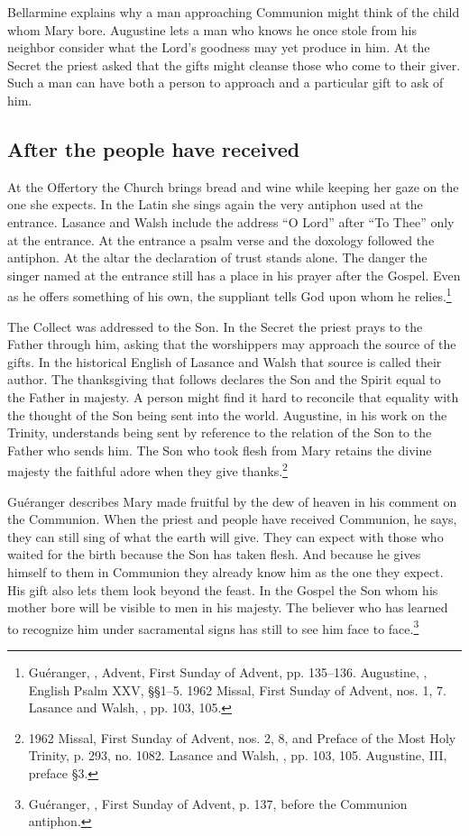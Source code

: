 Bellarmine explains why a man approaching Communion might think of the child whom Mary bore. Augustine lets a man who knows he once stole from his neighbor consider what the Lord's goodness may yet produce in him. At the Secret the priest asked that the gifts might cleanse those who come to their giver. Such a man can have both a person to approach and a particular gift to ask of him.

\subsection{After the people have received}

At the Offertory the Church brings bread and wine while keeping her gaze on the one she expects. In the Latin she sings again the very antiphon used at the entrance. Lasance and Walsh include the address “O Lord” after “To Thee” only at the entrance. At the entrance a psalm verse and the doxology followed the antiphon. At the altar the declaration of trust stands alone. The danger the singer named at the entrance still has a place in his prayer after the Gospel. Even as he offers something of his own, the suppliant tells God upon whom he relies.\footnote{Guéranger, , Advent, First Sunday of Advent, pp. 135--136. Augustine, , English Psalm XXV, §§1--5. 1962 Missal, First Sunday of Advent, nos. 1, 7. Lasance and Walsh, , pp. 103, 105.}

The Collect was addressed to the Son. In the Secret the priest prays to the Father through him, asking that the worshippers may approach the source of the gifts. In the historical English of Lasance and Walsh that source is called their author. The thanksgiving that follows declares the Son and the Spirit equal to the Father in majesty. A person might find it hard to reconcile that equality with the thought of the Son being sent into the world. Augustine, in his work on the Trinity, understands being sent by reference to the relation of the Son to the Father who sends him. The Son who took flesh from Mary retains the divine majesty the faithful adore when they give thanks.\footnote{1962 Missal, First Sunday of Advent, nos. 2, 8, and Preface of the Most Holy Trinity, p. 293, no. 1082. Lasance and Walsh, , pp. 103, 105. Augustine,  III, preface §3.}

Guéranger describes Mary made fruitful by the dew of heaven in his comment on the Communion. When the priest and people have received Communion, he says, they can still sing of what the earth will give. They can expect with those who waited for the birth because the Son has taken flesh. And because he gives himself to them in Communion they already know him as the one they expect. His gift also lets them look beyond the feast. In the Gospel the Son whom his mother bore will be visible to men in his majesty. The believer who has learned to recognize him under sacramental signs has still to see him face to face.\footnote{Guéranger, , First Sunday of Advent, p. 137, before the Communion antiphon.}

